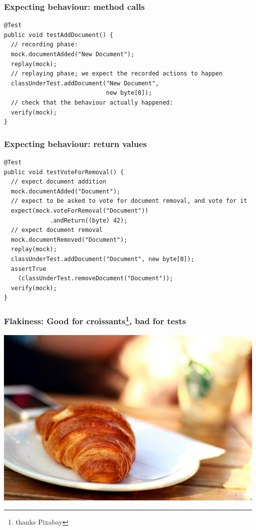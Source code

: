 \documentclass{beamer}
\begin{document}
\begin{frame}[fragile]
  \frametitle{Expecting behaviour: method calls}
{\small
  \begin{lstlisting}
@Test
public void testAddDocument() {
  // recording phase:
  mock.documentAdded("New Document");
  replay(mock);
  // replaying phase; we expect the recorded actions to happen
  classUnderTest.addDocument("New Document",
                             new byte[0]);
  // check that the behaviour actually happened:
  verify(mock);
}
  \end{lstlisting}
  }
\end{frame}

\begin{frame}[fragile]
  \frametitle{Expecting behaviour: return values}
{\small
  \begin{lstlisting}
@Test
public void testVoteForRemoval() {
  // expect document addition
  mock.documentAdded("Document");
  // expect to be asked to vote for document removal, and vote for it
  expect(mock.voteForRemoval("Document"))
             .andReturn((byte) 42);
  // expect document removal
  mock.documentRemoved("Document");
  replay(mock);
  classUnderTest.addDocument("Document", new byte[0]);
  assertTrue
    (classUnderTest.removeDocument("Document"));
  verify(mock);
}  \end{lstlisting}
  }
\end{frame}


\begin{frame}
  \frametitle{Flakiness: Good for croissants\footnote{thanks Pixabay}, bad for tests}
  \includegraphics[width=\textwidth]{L26/croissant-410322_1920.jpg}
\end{frame}
\end{document}
